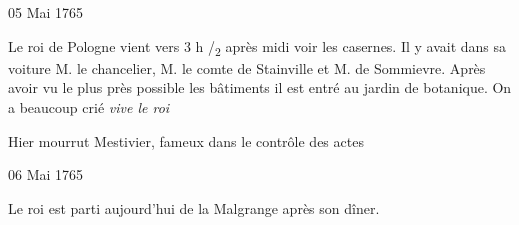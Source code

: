                      \begin{diary}{05 Mai 1765}{}
                        
                        
                           Le roi de Pologne vient vers 3 h /\textsubscript{2} après midi
                           voir les casernes. Il y avait dans sa
                           voiture
                           M. le chancelier, M. le comte de Stainville
                           et M. de Sommievre. Après
                           avoir vu le plus
                           près possible les bâtiments il est entré au
                           jardin de botanique. On a
                           beaucoup crié
                           \og \emph{vive le roi} \fg{}
                        \bigskip
        
        
                         Hier mourrut 
                           Mestivier, fameux
                           dans le contrôle des actes \bigskip
        
        
                     \end{diary}
                     \begin{diary}{06 Mai 1765}{}
                        
                        
                           Le roi est parti aujourd'hui de
                              la Malgrange
                           après son dîner. \bigskip
        
        
                     \end{diary}
                     
